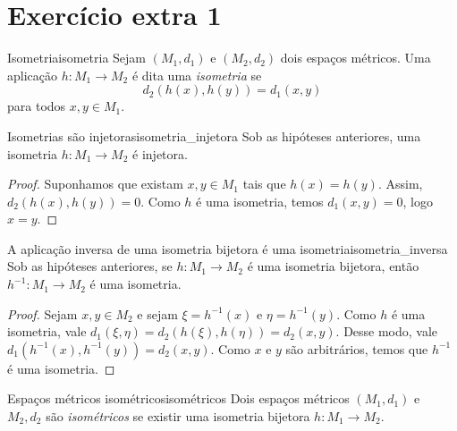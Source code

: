 \section*{Exercício extra 1}
\begin{definition}{Isometria}{isometria}
    Sejam \((M_1, d_1)\) e \((M_2, d_2)\) dois espaços métricos. Uma aplicação \(h : M_1 \to M_2\) é dita uma \emph{isometria} se
    \begin{equation*}
        d_2(h(x), h(y)) = d_1(x,y)
    \end{equation*}
    para todos \(x,y \in M_1\).
\end{definition}

\begin{proposition}{Isometrias são injetoras}{isometria_injetora}
    Sob as hipóteses anteriores, uma isometria \(h : M_1 \to M_2\) é injetora.
\end{proposition}
\begin{proof}
    Suponhamos que existam \(x, y \in M_1\) tais que \(h(x) = h(y)\). Assim, \(d_2(h(x), h(y)) = 0\). Como \(h\) é uma isometria, temos \(d_1(x,y) = 0\), logo \(x = y\).
\end{proof}

\begin{proposition}{A aplicação inversa de uma isometria bijetora é uma isometria}{isometria_inversa}
    Sob as hipóteses anteriores, se \(h : M_1 \to M_2\) é uma isometria bijetora, então \(h^{-1} : M_1 \to M_2\) é uma isometria.
\end{proposition}
\begin{proof}
    Sejam \(x, y \in M_2\) e sejam \(\xi = h^{-1}(x)\) e \(\eta = h^{-1}(y)\). Como \(h\) é uma isometria, vale \(d_1(\xi, \eta) = d_2(h(\xi),h(\eta)) = d_2(x,y)\). Desse modo, vale \(d_1(h^{-1}(x), h^{-1}(y)) = d_2(x,y)\). Como \(x\) e \(y\) são arbitrários, temos que \(h^{-1}\) é uma isometria.
\end{proof}

\begin{definition}{Espaços métricos isométricos}{isométricos}
    Dois espaços métricos \((M_1, d_1)\) e \(M_2, d_2\) são \emph{isométricos} se existir uma isometria bijetora \(h : M_1 \to M_2\).
\end{definition}

